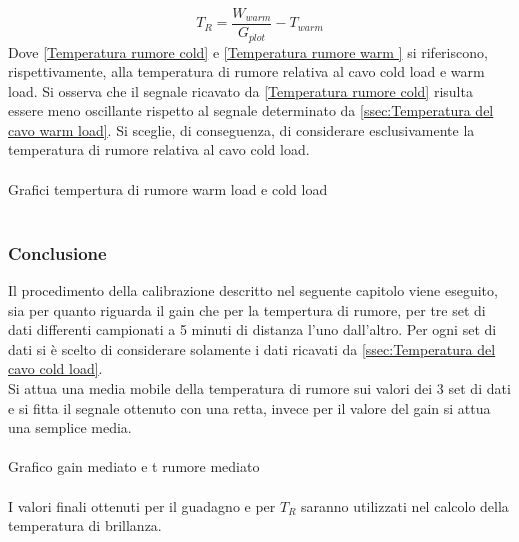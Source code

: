 \begin{equation}
T_{R} = \dfrac{W_{warm}}{G_{plot}}-T_{warm}
\label{Temperatura rumore warm}
\end{equation}
Dove \eqref{Temperatura rumore cold} e \eqref{Temperatura rumore warm } si riferiscono, rispettivamente, alla temperatura di rumore relativa al cavo cold load e warm load.
Si osserva che il segnale ricavato da \eqref{Temperatura rumore cold} risulta essere meno oscillante rispetto al segnale determinato da \eqref{ssec:Temperatura del cavo warm load}. Si sceglie, di conseguenza, di considerare esclusivamente la temperatura di rumore relativa al cavo cold load.
\\\\
Grafici tempertura di rumore warm load e cold load
\\\\

\subsubsection{Conclusione}
Il procedimento della calibrazione descritto nel seguente capitolo viene eseguito, sia per quanto riguarda il gain che per la tempertura di rumore, per tre set di dati differenti campionati a 5 minuti di distanza l'uno dall'altro. Per ogni set di dati si è scelto di considerare solamente i dati ricavati da \eqref{ssec:Temperatura del cavo cold load}.\\
Si attua una media mobile della temperatura di rumore sui  valori dei 3 set di dati e si fitta il segnale ottenuto con una retta, invece per il valore del gain si attua una semplice media.
\\\\
Grafico gain mediato e t rumore mediato
\\\\
I valori finali ottenuti per il guadagno e per $T_{R}$ saranno utilizzati nel calcolo della temperatura di brillanza.
